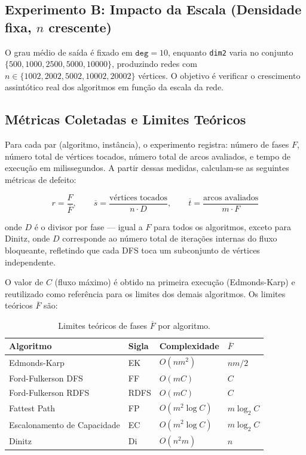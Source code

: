 \documentclass{infufrgs}
\begin{document}
\subsection{Experimento B: Impacto da Escala (Densidade fixa, \texorpdfstring{$n$}{n} crescente)}

O grau médio de saída é fixado em $\texttt{deg} = 10$, enquanto \texttt{dim2} varia no conjunto $\{500, 1000, 2500, 5000, 10000\}$, produzindo redes com $n \in \{1002, 2002, 5002, 10002, 20002\}$ vértices. O objetivo é verificar o crescimento assintótico real dos algoritmos em função da escala da rede.

\subsection{Métricas Coletadas e Limites Teóricos}

Para cada par (algoritmo, instância), o experimento registra: número de fases $F$, número total de vértices tocados, número total de arcos avaliados, e tempo de execução em milissegundos. A partir dessas medidas, calculam-se as seguintes métricas de defeito:

\begin{equation}
    r = \frac{F}{\overline{F}}, \qquad
    \overline{s} = \frac{\text{vértices tocados}}{n \cdot D}, \qquad
    \overline{t} = \frac{\text{arcos avaliados}}{m \cdot F}
\end{equation}

\noindent onde $D$ é o divisor por fase — igual a $F$ para todos os algoritmos, exceto para Dinitz, onde $D$ corresponde ao número total de iterações internas do fluxo bloqueante, refletindo que cada DFS toca um subconjunto de vértices independente.

O valor de $C$ (fluxo máximo) é obtido na primeira execução (Edmonds-Karp) e reutilizado como referência para os limites dos demais algoritmos. Os limites teóricos $\overline{F}$ são:

\begin{table}[H]
\centering
\caption{Limites teóricos de fases $\overline{F}$ por algoritmo.}
\label{tab:limites-teoricos}
\begin{tabular}{llll}
\toprule
\textbf{Algoritmo} & \textbf{Sigla} & \textbf{Complexidade} & \textbf{$\overline{F}$} \\
\midrule
Edmonds-Karp                & EK   & $O(nm^2)$           & $nm/2$        \\
Ford-Fulkerson DFS          & FF   & $O(mC)$             & $C$           \\
Ford-Fulkerson RDFS         & RDFS & $O(mC)$             & $C$           \\
Fattest Path                & FP   & $O(m^2 \log C)$     & $m \log_2 C$  \\
Escalonamento de Capacidade & EC   & $O(m^2 \log C)$     & $m \log_2 C$  \\
Dinitz                      & Di   & $O(n^2 m)$          & $n$           \\
\bottomrule
\end{tabular}
\end{table}
\end{document}
